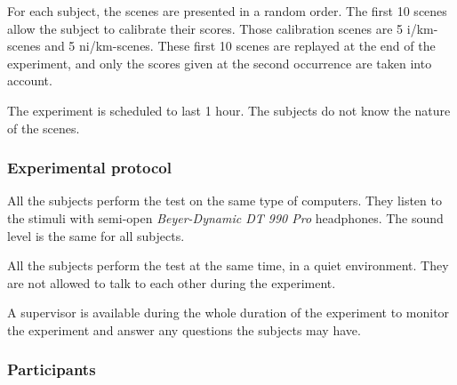 \documentclass[preprint,12pt]{elsarticle}
\begin{document}
For each subject, the scenes are presented in a random order. The first 10 scenes allow the subject to calibrate their scores. Those calibration scenes are  5 i/km-scenes and 5 ni/km-scenes. These first 10 scenes are replayed at the end of the experiment, and only the scores given at the second occurrence are taken into account.

The experiment is scheduled to last 1 hour. The subjects do not know the nature of the scenes.

\subsubsection*{Experimental protocol}


All the subjects perform the test on the same type of computers. They listen to the stimuli with semi-open \emph{Beyer-Dynamic DT 990 Pro} headphones. The sound level is the same for all subjects.


All the subjects perform the test at the same time, in a quiet environment. They are not allowed to talk to each other during the experiment.


A supervisor is available during the whole duration of the experiment to monitor the experiment and answer any questions the subjects may have.

\subsubsection*{Participants}

\end{document}
